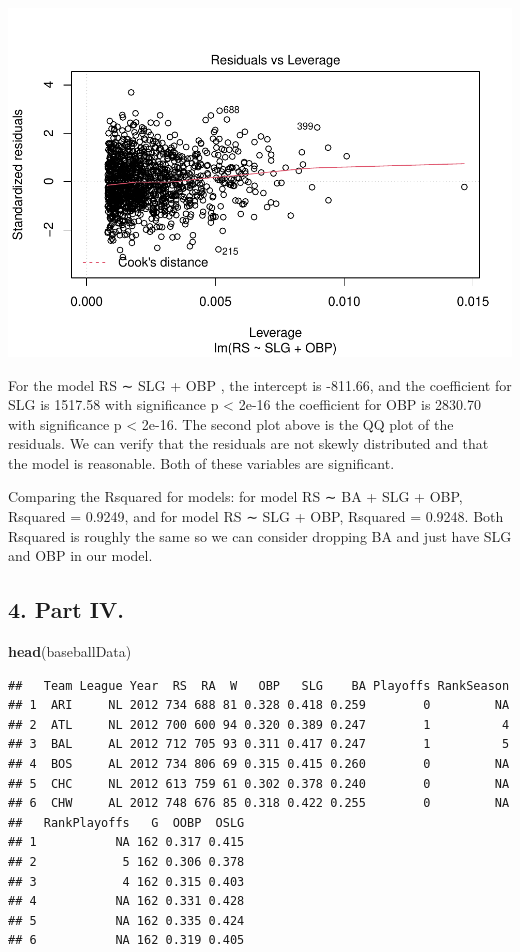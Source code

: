 \documentclass[
]{article}
\newenvironment{Shaded}{\begin{snugshade}}{\end{snugshade}}
\newcommand{\KeywordTok}[1]{\textcolor[rgb]{0.13,0.29,0.53}{\textbf{#1}}}
\newcommand{\NormalTok}[1]{#1}
\begin{document}
\includegraphics{HW2_Liu-Zi-Jian_files/figure-latex/unnamed-chunk-41-4.pdf}

For the model RS ∼ SLG + OBP , the intercept is -811.66, and the
coefficient for SLG is 1517.58 with significance p \textless{} 2e-16 the
coefficient for OBP is 2830.70 with significance p \textless{} 2e-16.
The second plot above is the QQ plot of the residuals. We can verify
that the residuals are not skewly distributed and that the model is
reasonable. Both of these variables are significant.

Comparing the Rsquared for models: for model RS ∼ BA + SLG + OBP,
Rsquared = 0.9249, and for model RS ∼ SLG + OBP, Rsquared = 0.9248. Both
Rsquared is roughly the same so we can consider dropping BA and just
have SLG and OBP in our model.

\hypertarget{part-iv.}{%
\subsection{4. Part IV.}\label{part-iv.}}

\begin{Shaded}
\begin{Highlighting}[]
\KeywordTok{head}\NormalTok{(baseballData)}
\end{Highlighting}
\end{Shaded}

\begin{verbatim}
##   Team League Year  RS  RA  W   OBP   SLG    BA Playoffs RankSeason
## 1  ARI     NL 2012 734 688 81 0.328 0.418 0.259        0         NA
## 2  ATL     NL 2012 700 600 94 0.320 0.389 0.247        1          4
## 3  BAL     AL 2012 712 705 93 0.311 0.417 0.247        1          5
## 4  BOS     AL 2012 734 806 69 0.315 0.415 0.260        0         NA
## 5  CHC     NL 2012 613 759 61 0.302 0.378 0.240        0         NA
## 6  CHW     AL 2012 748 676 85 0.318 0.422 0.255        0         NA
##   RankPlayoffs   G  OOBP  OSLG
## 1           NA 162 0.317 0.415
## 2            5 162 0.306 0.378
## 3            4 162 0.315 0.403
## 4           NA 162 0.331 0.428
## 5           NA 162 0.335 0.424
## 6           NA 162 0.319 0.405
\end{verbatim}
\end{document}
